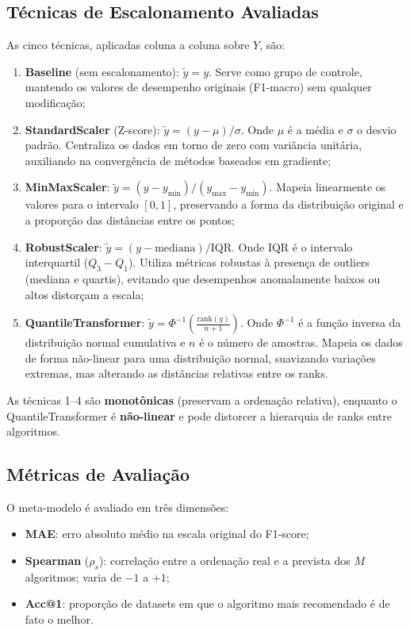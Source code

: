 \documentclass[12pt]{article}
\begin{document}
\subsection{Técnicas de Escalonamento Avaliadas}

As cinco técnicas, aplicadas coluna a coluna sobre $Y$, são:
\begin{enumerate}
  \item \textbf{Baseline} (sem escalonamento): $\tilde{y} = y$. Serve como grupo de controle, mantendo os valores de desempenho originais (F1-macro) sem qualquer modificação;
  \item \textbf{StandardScaler} (Z-score): $\tilde{y} = (y - \mu) / \sigma$. Onde $\mu$ é a média e $\sigma$ o desvio padrão. Centraliza os dados em torno de zero com variância unitária, auxiliando na convergência de métodos baseados em gradiente;
  \item \textbf{MinMaxScaler}: $\tilde{y} = (y - y_{\min}) / (y_{\max} - y_{\min})$. Mapeia linearmente os valores para o intervalo $[0, 1]$, preservando a forma da distribuição original e a proporção das distâncias entre os pontos;
  \item \textbf{RobustScaler}: $\tilde{y} = (y - \text{mediana}) / \text{IQR}$. Onde $\text{IQR}$ é o intervalo interquartil ($Q_3 - Q_1$). Utiliza métricas robustas à presença de outliers (mediana e quartis), evitando que desempenhos anomalamente baixos ou altos distorçam a escala;
  \item \textbf{QuantileTransformer}: $\tilde{y} = \Phi^{-1}\!\left( \frac{\text{rank}(y)}{n+1} \right)$. Onde $\Phi^{-1}$ é a função inversa da distribuição normal cumulativa e $n$ é o número de amostras. Mapeia os dados de forma não-linear para uma distribuição normal, suavizando variações extremas, mas alterando as distâncias relativas entre os ranks.
\end{enumerate}

As técnicas 1--4 são \textbf{monotônicas} (preservam a ordenação relativa), enquanto o QuantileTransformer é \textbf{não-linear} e pode distorcer a hierarquia de ranks entre algoritmos.

\subsection{Métricas de Avaliação}

O meta-modelo é avaliado em três dimensões:
\begin{itemize}
  \item \textbf{MAE}: erro absoluto médio na escala original do F1-score;
  \item \textbf{Spearman} ($\rho_s$): correlação entre a ordenação real e a prevista dos $M$ algoritmos; varia de $-1$ a $+1$;
  \item \textbf{Acc@1}: proporção de datasets em que o algoritmo mais recomendado é de fato o melhor.
\end{itemize}
\end{document}
